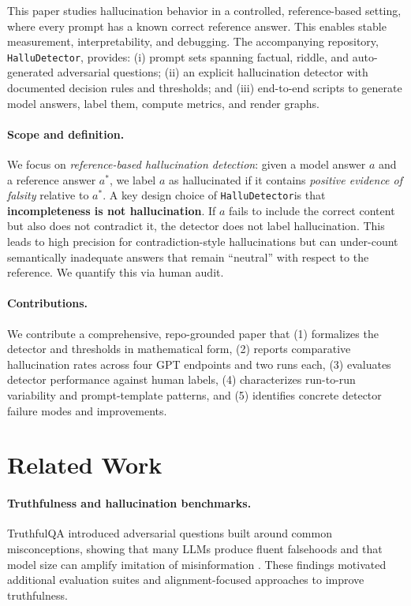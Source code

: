 \documentclass[11pt]{article}
\newcommand{\dataset}{\texttt{HalluDetector}}
\begin{document}
This paper studies hallucination behavior in a controlled, reference-based setting, where every prompt has a known correct reference answer. This enables stable measurement, interpretability, and debugging. The accompanying repository, \dataset, provides: (i) prompt sets spanning factual, riddle, and auto-generated adversarial questions; (ii) an explicit hallucination detector with documented decision rules and thresholds; and (iii) end-to-end scripts to generate model answers, label them, compute metrics, and render graphs.

\paragraph{Scope and definition.}
We focus on \emph{reference-based hallucination detection}: given a model answer \(a\) and a reference answer \(a^*\), we label \(a\) as hallucinated if it contains \emph{positive evidence of falsity} relative to \(a^*\). A key design choice of \dataset is that \textbf{incompleteness is not hallucination}. If \(a\) fails to include the correct content but also does not contradict it, the detector does not label hallucination. This leads to high precision for contradiction-style hallucinations but can under-count semantically inadequate answers that remain ``neutral'' with respect to the reference. We quantify this via human audit.

\paragraph{Contributions.}
We contribute a comprehensive, repo-grounded paper that (1) formalizes the detector and thresholds in mathematical form, (2) reports comparative hallucination rates across four GPT endpoints and two runs each, (3) evaluates detector performance against human labels, (4) characterizes run-to-run variability and prompt-template patterns, and (5) identifies concrete detector failure modes and improvements.

\section{Related Work}
\paragraph{Truthfulness and hallucination benchmarks.}
TruthfulQA introduced adversarial questions built around common misconceptions, showing that many LLMs produce fluent falsehoods and that model size can amplify imitation of misinformation \cite{lin2022truthfulqa}. These findings motivated additional evaluation suites and alignment-focused approaches to improve truthfulness.
\end{document}
